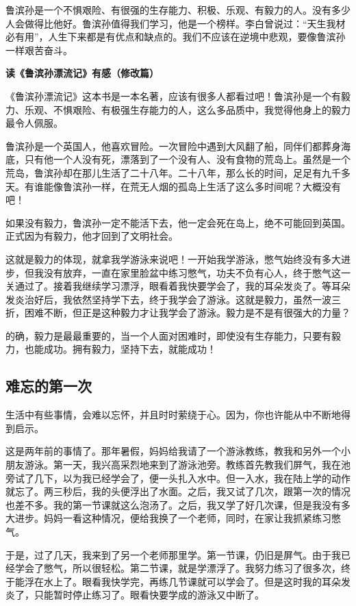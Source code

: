 \documentclass[UTF8,a4paper,titlepage,twoside,10.5pt]{article}
\begin{document}
鲁滨孙是一个不惧艰险、有很强的生存能力、积极、乐观、有毅力的人。没有多少人会做得比他好。鲁滨孙值得我们学习，他是一个榜样。李白曾说过：“天生我材必有用”，人生下来都是有优点和缺点的。我们不应该在逆境中悲观，要像鲁滨孙一样艰苦奋斗。

\vspace*{\baselineskip}

\textbf{读《鲁滨孙漂流记》有感（修改篇）}

《鲁滨孙漂流记》这本书是一本名著，应该有很多人都看过吧！鲁滨孙是一个有毅力、乐观、不惧艰险、有极强生存能力的人，这么多品质中，我觉得他身上的毅力最令人佩服。

鲁滨孙是一个英国人，他喜欢冒险。一次冒险中遇到大风翻了船，同伴们都葬身海底，只有他一个人没有死，漂落到了一个没有人、没有食物的荒岛上。虽然是一个荒岛，鲁滨孙却在那儿生活了二十八年。二十八年，那么长的时间，足足有九千多天。有谁能像鲁滨孙一样，在荒无人烟的孤岛上生活了这么多时间呢？大概没有吧！

如果没有毅力，鲁滨孙一定不能活下去，他一定会死在岛上，绝不可能回到英国。正式因为有毅力，他才回到了文明社会。

这就是毅力的体现，就拿我学游泳来说吧！一开始我学游泳，憋气始终没有多大进步，但我没有放弃，一直在家里脸盆中练习憋气，功夫不负有心人，终于憋气这一关通过了。接着我继续学习漂浮，眼看着我快要学会了，我的耳朵发炎了。等耳朵发炎治好后，我依然坚持学下去，终于我学会了游泳。这就是毅力，虽然一波三折，困难不断，但正是这种毅力才让我学会了游泳。毅力是不是有很强大的力量？

的确，毅力是最最重要的，当一个人面对困难时，即使没有生存能力，只要有毅力，也能成功。拥有毅力，坚持下去，就能成功！

\subsection{难忘的第一次}
\label{sec:orgf12ed53}

生活中有些事情，会难以忘怀，并且时时萦绕于心。因为，你也许能从中不断地得到启示。

这是两年前的事情了。那年暑假，妈妈给我请了一个游泳教练，教我和另外一个小朋友游泳。第一天，我兴高采烈地来到了游泳池旁。教练首先教我们屏气，我在池旁试了几下，以为我已经学会了，便一头扎入水中。但一入水，我在陆上学的动作就忘了。两三秒后，我的头便浮出了水面。之后，我又试了几次，跟第一次的情况也差不多。我的第一节课就这么泡汤了。之后，我又学了好几次课，但是我没有多大进步。妈妈一看这种情况，便给我换了一个老师，同时，在家让我抓紧练习憋气。

于是，过了几天，我来到了另一个老师那里学。第一节课，仍旧是屏气。由于我已经学会了憋气，所以很轻松。第二节课，就是学漂浮了。我努力练习了很多次，终于能浮在水上了。眼看我快学完，再练几节课就可以学会了。但是这时我的耳朵发炎了，只能暂时停止练习了。眼看快要学成的游泳又中断了。
\end{document}
